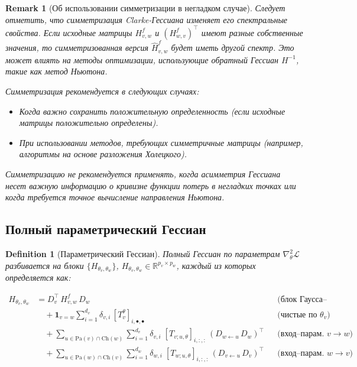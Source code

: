 \documentclass[11pt]{article}
\newtheorem{remark}{Remark}
\newtheorem{definition}{Definition}
\newcommand{\Pa}{\mathrm{Pa}} %
\newcommand{\Ch}{\mathrm{Ch}} %
\begin{document}
\begin{remark}[Об использовании симметризации в негладком случае]
  Следует отметить, что симметризация Clarke-Гессиана изменяет его спектральные свойства. Если исходные
  матрицы $H^f_{v,w}$ и $(H^f_{w,v})^\top$ имеют разные собственные значения, то симметризованная версия
  $\hat{H}^f_{v,w}$ будет иметь другой спектр. Это может влиять на методы оптимизации, использующие обратный
  Гессиан $H^{-1}$, такие как метод Ньютона.

  Симметризация рекомендуется в следующих случаях:
  \begin{itemize}
    \item Когда важно сохранить положительную определенность (если исходные матрицы положительно определены).
    \item При использовании методов, требующих симметричные матрицы (например, алгоритмы на основе разложения
      Холецкого).
  \end{itemize}

  Симметризацию не рекомендуется применять, когда асимметрия Гессиана несет важную информацию о кривизне
  функции потерь в негладких точках или когда требуется точное вычисление направления Ньютона.
\end{remark}

\subsection{Полный параметрический Гессиан}

\begin{definition}[Параметрический Гессиан]
  Полный Гессиан по параметрам $\nabla^2_{\theta}\mathcal L$ разбивается на блоки
  $\{H_{\theta_v,\theta_w}\}$, $H_{\theta_v,\theta_w}\in\mathbb{R}^{p_v\times p_w}$, каждый из которых определяется как:
\end{definition}

\begin{equation}\label{eq:Htheta}
  \boxed{
    \begin{aligned}
      H_{\theta_v,\theta_w}
      &= D_v^{\!\top}\,H^{f}_{v,w}\,D_w
      &&\text{(блок Гаусса–Ньютона)}\\
      &\quad+\mathbf{1}_{v=w}\sum_{i=1}^{d_v}
      \delta_{v,i}\,[T_v^{\theta}]_{i,\bullet,\bullet}
      &&\text{(чистые по }\theta_v)\\
      &\quad+\!\!\!\!
      \sum_{u\in \Pa(v)\cap\Ch(w)}
      \sum_{i=1}^{d_v}\!
      \delta_{v,i}\;
      [T_{v;u,\theta}]_{i,:,:}\,
      (D_{w\gets u}\,D_w)^{\top}
      &&\text{(вход–парам.\ $v\to w$)}\\
      &\quad+\!\!\!\!
      \sum_{u\in \Pa(w)\cap\Ch(v)}
      \sum_{i=1}^{d_w}\!
      \delta_{w,i}\;
      [T_{w;u,\theta}]_{i,:,:}\,
      (D_{v\gets u}\,D_v)^{\top}
      &&\text{(вход–парам.\ $w\to v$)}
  \end{aligned}}
\end{equation}
\end{document}
